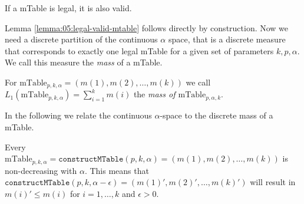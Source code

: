 %
\begin{lemma}
	\label{lemma:05:legal-valid-mtable}
	If a mTable is legal, it is also valid.
\end{lemma}
%
\noindent Lemma \ref{lemma:05:legal-valid-mtable} follows directly by construction.
%
Now we need a discrete partition of the continuous $\alpha$ space, that is a discrete measure that corresponds to exactly one legal mTable for a given set of parameters $k,p,\alpha$. 
%
We call this measure the \emph{mass} of a mTable.
%
%
%
%
\begin{definition}
	\label{def:05:Mass of a MTable}
	For $\text{mTable}_{p,k,\alpha}=(m(1) , m(2) , \ldots , m(k))$ we call\\
	$L_1(\text{mTable}_{p,k,\alpha})=\sum_{i=1}^k m(i)$ the \textit{mass of $\text{mTable}_{p,\alpha,k}$}.
\end{definition}
%
In the following we relate the continuous $\alpha$-space to the discrete mass of a mTable.
%
\begin{lemma}
	\label{lemma:05:non-decreasing-with-alpha-mtable}
	Every $\text{mTable}_{p,k,\alpha}=\texttt{constructMTable}(p,k,\alpha)=(m(1) , m(2) , \ldots , m(k))$ is non-decreasing with $\alpha$. This means that
	$\texttt{constructMTable}(p,k,\alpha - \epsilon) = (m(1)' , m(2)' , \ldots , m(k)')$ will result in $m(i)' \leq m(i)$ for $i=1,\ldots,k$ and $\epsilon > 0$.
\end{lemma}
